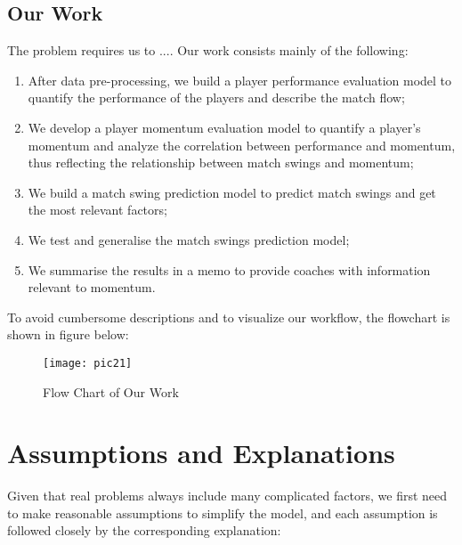 \documentclass[12pt]{article}  %
\begin{document}
\subsection{Our Work}
The problem requires us to .... Our work consists mainly of the following:
\begin{enumerate}[\hspace{1.5em}1)]
    \setlength{\parsep}{0ex} %
    \setlength{\topsep}{0.5pt} %
    \setlength{\itemsep}{0.5pt} %
    \item After data pre-processing, we build a player performance evaluation model to quantify the performance of the players and describe the match flow;
    \item We develop a player momentum evaluation model to quantify a player's momentum and analyze the correlation between performance and momentum, thus reflecting the relationship between match swings and momentum;
    \item We build a match swing prediction model to predict match swings and get the most relevant factors;
    \item We test and generalise the match swings prediction model;
    \item We summarise the results in a memo to provide coaches with information relevant to momentum.
\end{enumerate}

To avoid cumbersome descriptions and to visualize our workflow, the flowchart is shown in figure below:

\begin{figure}[htbp]  %
	\centering  %
	\texttt{[image: pic21]} %
	\caption{Flow Chart of Our Work}  
	\label{pic21}
\end{figure}


\section{Assumptions and Explanations}
Given that real problems always include many complicated factors, we first need to make reasonable assumptions to simplify the model, and each assumption is followed closely by the corresponding explanation:
\end{document}
